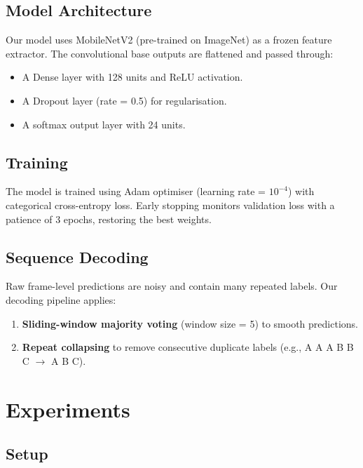 \documentclass[12pt, a4paper]{article}
\begin{document}
\subsection{Model Architecture}

Our model uses MobileNetV2 (pre-trained on ImageNet) as a frozen feature extractor. The convolutional base outputs are flattened and passed through:
\begin{itemize}
    \item A Dense layer with 128 units and ReLU activation.
    \item A Dropout layer (rate = 0.5) for regularisation.
    \item A softmax output layer with 24 units.
\end{itemize}

\subsection{Training}

The model is trained using Adam optimiser (learning rate = $10^{-4}$) with categorical cross-entropy loss. Early stopping monitors validation loss with a patience of 3 epochs, restoring the best weights.

\subsection{Sequence Decoding}

Raw frame-level predictions are noisy and contain many repeated labels. Our decoding pipeline applies:
\begin{enumerate}
    \item \textbf{Sliding-window majority voting} (window size = 5) to smooth predictions.
    \item \textbf{Repeat collapsing} to remove consecutive duplicate labels (e.g., A A A B B C $\rightarrow$ A B C).
\end{enumerate}

\section{Experiments}

\subsection{Setup}
\end{document}
